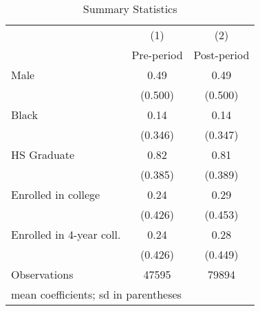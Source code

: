 \begin{table}[htbp]\centering
\caption{Summary Statistics}
\begin{tabular}{l*{2}{c}}
\hline\hline
                    &\multicolumn{1}{c}{(1)}&\multicolumn{1}{c}{(2)}\\
                    &\multicolumn{1}{c}{Pre-period}&\multicolumn{1}{c}{Post-period}\\
\hline
Male                &        0.49&        0.49\\
                    &     (0.500)&     (0.500)\\
[1em]
Black               &        0.14&        0.14\\
                    &     (0.346)&     (0.347)\\
[1em]
HS Graduate         &        0.82&        0.81\\
                    &     (0.385)&     (0.389)\\
[1em]
Enrolled in college &        0.24&        0.29\\
                    &     (0.426)&     (0.453)\\
[1em]
Enrolled in 4-year coll.&        0.24&        0.28\\
                    &     (0.426)&     (0.449)\\
\hline
Observations        &       47595&       79894\\
\hline\hline
\multicolumn{3}{l}{\footnotesize mean coefficients; sd in parentheses}\\
\end{tabular}
\end{table}
